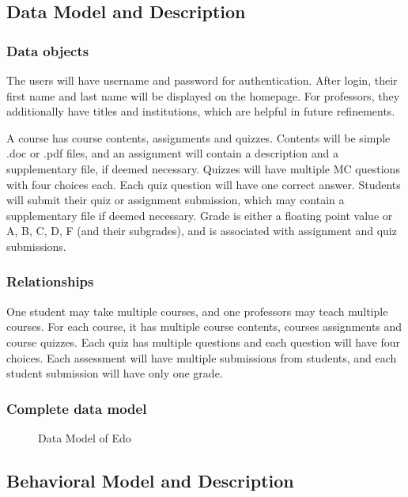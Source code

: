 \documentclass[paper=a4, fontsize=11pt]{scrartcl}
\numberwithin{equation}{section}		%
\numberwithin{figure}{section}			%
\numberwithin{table}{section}				%
\begin{document}
\subsection{Data Model and Description}

\subsubsection{Data objects}
The users will have username and password for authentication. After login, their first name and last name will be displayed on the homepage. For professors, they additionally have titles and institutions, which are helpful in future refinements.

A course has course contents, assignments and quizzes. Contents will be simple .doc or .pdf files, and an assignment will contain a description and a supplementary file, if deemed necessary. Quizzes will have multiple MC questions with four choices each. Each quiz question will have one correct answer. Students will submit their quiz or assignment submission, which may contain a supplementary file if deemed necessary. Grade is either a floating point value or A, B, C, D, F (and their subgrades), and is associated with assignment and quiz submissions.

\subsubsection{Relationships}
One student may take multiple courses, and one professors may teach multiple courses. For each course, it has multiple course contents, courses assignments and course quizzes. Each quiz has multiple questions and each question will have four choices. Each assessment will have multiple submissions from students, and each student submission will have only one grade. 

\subsubsection{Complete data model}
\begin{figure}[!ht]
	\begin{center}
	\end{center}
	\caption{Data Model of Edo}
\end{figure}


\subsection{Behavioral Model and Description}
\end{document}
